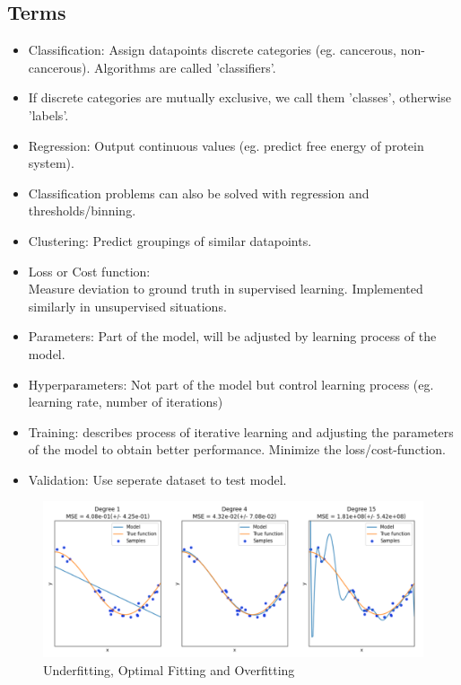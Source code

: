 \subsection{Terms}
\label{subsec:concepts-terms}
\begin{frame}{\insertsubsection}
    \pause
    \begin{itemize}[<+->]
        \item Classification: Assign datapoints discrete categories (eg. cancerous, non-cancerous). Algorithms are called 'classifiers'.
        \item[] If discrete categories are mutually exclusive, we call them 'classes', otherwise 'labels'.
        \item Regression: Output continuous values (eg. predict free energy of protein system).
        \item Classification problems can also be solved with regression and thresholds/binning.
        \item Clustering: Predict groupings of similar datapoints.
    \end{itemize}
\end{frame}
%
%
\begin{frame}{\insertsubsection}
    \begin{itemize}[<+->]
        \item Loss or Cost function:\\
        Measure deviation to ground truth in supervised learning.
        Implemented similarly in unsupervised situations.
        \item Parameters: Part of the model, will be adjusted by learning process of the model.
        \item Hyperparameters: Not part of the model but control learning process (eg. learning rate, number of iterations)
        \item Training: describes process of iterative learning and adjusting the parameters of the model to obtain better performance. Minimize the loss/cost-function.
        \item Validation: Use seperate dataset to test model.
    \end{itemize}
\end{frame}
%
%
\begin{frame}{\insertsubsection}
    \begin{figure}
        \centering
        \includegraphics[width=\textwidth]{media/underfitting_and_overfitting_in_machine_learning_image.png}
        \caption{Underfitting, Optimal Fitting and Overfitting~\cite{Tripathi2020}}
    \end{figure}
\end{frame}
%
%

